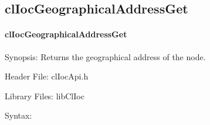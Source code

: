 \begin{flushleft}
\subsection{clIocGeographicalAddressGet}
\hypertarget{pageIOC125}{}\paragraph{cl\-Ioc\-Geographical\-Address\-Get}\label{pageIOC125}
\begin{Desc}
\item[Synopsis: ]Returns the geographical address of the node.\end{Desc}
\begin{Desc}
\item[Header File:]clIocApi.h\end{Desc}
\begin{Desc}
\item[Library Files:]libClIoc\end{Desc}
\begin{Desc}
\item[Syntax: ]


\end{Desc}
\end{flushleft}
